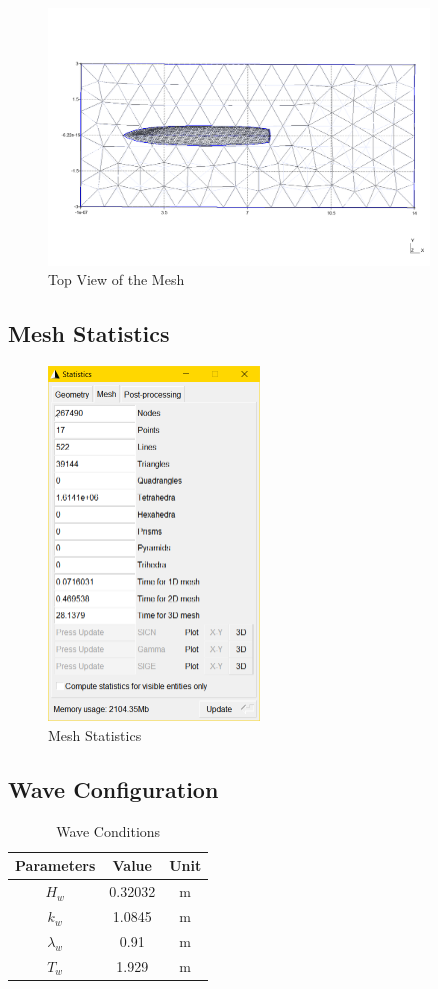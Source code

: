 \documentclass[12pt]{article} %
\begin{document}
\begin{figure}[ht]
    \centering
    \includegraphics[width=0.9\textwidth]{Mesh_4.png}
    \caption{Top View of the Mesh}
\end{figure}
\clearpage
\subsection{Mesh Statistics}
\begin{figure}[ht]
    \centering
    \includegraphics[width=0.5\textwidth]{MS.png}
    \caption{Mesh Statistics}
\end{figure}
\subsection{Wave Configuration}
\begin{table}[ht]
    \caption{Wave Conditions}
    \centering
    \begin{tabular}{|c|c|c|}
        \hline
        Parameters & Value & Unit\\
        \hline   
        $H_w$ & 0.32032 & m \\
        $k_w$ & 1.0845 & m\\
        $\lambda_w$ & 0.91 & m\\
        $T_w$ & 1.929 & m \\
        \hline
    \end{tabular}
\end{table}
\end{document}
